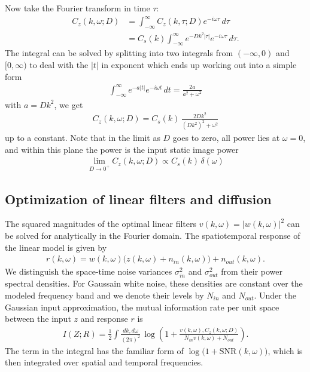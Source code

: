 \documentclass[12pt]{article}
\begin{document}
Now take the Fourier transform in time $\tau$:
\begin{align}
C_z(k,\omega;D) &= \int_{-\infty}^{\infty} C_z(k,\tau;D)e^{-i\omega \tau}\,d\tau \\
            &= C_s(k) \int_{-\infty}^{\infty} e^{-Dk^2|\tau|}e^{-i\omega \tau}\,d\tau.
\end{align}
The integral can be solved by splitting into two integrals from $(-\infty,0)$ and $[0,\infty)$ to deal with the $|t|$ in exponent which ends up working out into a simple form
\begin{align}
    \int_{-\infty}^{\infty} e^{-a|t|}e^{-i\omega t}\,dt = \frac{2a}{a^2+\omega^2}
\end{align}
with $a=Dk^2$, we get
\begin{align}
    C_z(k,\omega;D) = C_s(k)\,\frac{2Dk^2}{(Dk^2)^2+\omega^2}
\end{align}
up to a constant. Note that in the limit as $D$ goes to zero, all power lies at $\omega=0$, and within this plane the power is the input static image power
\begin{align}
    \lim_{D\rightarrow0^+}C_z(k,\omega;D) \propto C_s(k)\,\delta(\omega)
\end{align}


\subsection{Optimization of linear filters and diffusion} \label{sec:app_optimal_filters}

The squared magnitudes of the optimal linear filters $v(k,\omega) = |w(k,\omega)|^2$ can be solved for analytically in the Fourier domain.
The spatiotemporal response of the linear model is given by
\begin{align}
    r(k,\omega) = w(k,\omega) \big(z(k,\omega)+n_{in}(k,\omega) \big)+n_{out}(k,\omega).
\end{align}
We distinguish the space-time noise variances $\sigma_{in}^2$ and $\sigma_{out}^2$ from their power spectral densities. For Gaussain white noise, these densities are constant over the modeled frequency band and we denote their levels by $N_{in}$ and $N_{out}$. 
Under the Gaussian input approximation, the mutual information rate per unit space between the input $z$ and response $r$ is
\begin{align}
    I(Z;R) = \frac{1}{2} \int\frac{dk,d\omega}{(2\pi)^2}\, \log \left(1+ \frac{v(k,\omega) , C_z(k,\omega;D)}{N_{in}v(k,\omega) + N_{out}} \right).
\end{align}
The term in the integral has the familiar form of $\log\big(1+\text{SNR}(k,\omega)\big)$, which is then integrated over spatial and temporal frequencies. 
\end{document}
